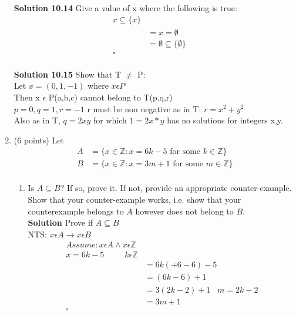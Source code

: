 \documentclass[12pt]{article}
\begin{document}
\begin{enumerate}
    
    
    \textbf{Solution 10.14}
    Give a value of x where the following is true:
           \[
\begin{aligned} 
 x \subseteq \{x\}\\
&=  x = \emptyset \;\; \\ 
&= \emptyset \subseteq \{\emptyset\} \;\;\;\;\;  \\
\square \\
\end{aligned}
\]
    
    \textbf{Solution 10.15}
    Show that T $\neq$ P:\\
    Let $x= \left( 0,1,-1\right)$ where $x \epsilon P$\\ 
    Then x $\epsilon$ P(a,b,c) cannot belong to T(p,q,r) \\
    $ p = 0, q = 1, r = -1$
    r must be non negative as in T: $r = x^2 + y^2$ \\ 
    Also as in T, $q=2xy$ for which $1=2x*y$ has no solutions for integers x,y. 
   
    
    \item (6 points)  Let 
    \[    
    \begin{aligned}
    A &= \{ x \in \mathbb{Z}: x = 6k -5 \mbox{ for some } k \in \mathbb{Z} \} \\
    B &= \{ x \in \mathbb{Z}: x = 3m + 1 \mbox{ for some } m \in \mathbb{Z} \} \\
    \end{aligned}
    \]
    \begin{enumerate}
        \item Is $A \subseteq B$?  If so, prove it.  If not, provide an appropriate counter-example.  Show that your counter-example works, i.e. show that your counterexample belongs to $A$ however does not belong to $B$.  \\
        
        \textbf{Solution} Prove if $A\subseteq B$ \\
        NTS: $x \epsilon A \rightarrow x \epsilon B$
            \[
\begin{aligned} 
Assume: x \epsilon A \wedge x \epsilon \mathbb{Z} \\
 x = 6k -5 \;\;\;\;\;\;\;\;\; k \epsilon \mathbb{Z} \\
&=  6k(+6-6) -5\;\; \\ 
&= (6k-6) +1 \;\;\;  \\
&= 3(2k-2) +1 \;\;\; m = 2k-2 \\
&= 3m+1 \\
\square \\
\end{aligned}
\]
        

\end{enumerate}
\end{enumerate}
\end{document}
